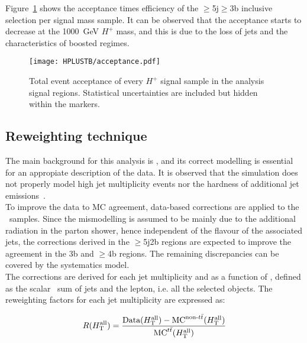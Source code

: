 Figure~\ref{Hplustb:acceptance} shows the acceptance times efficiency of the $\geq$5j$\geq$3b inclusive selection per signal mass sample. It can be observed that the acceptance starts to decrease at the 1000~GeV $H^+$ mass, and this is due to the loss of jets and the characteristics of boosted regimes.

\begin{figure}[htbp]
    \RawFloats
    \begin{center}
    \texttt{[image: HPLUSTB/acceptance.pdf]}
    \caption{
        Total event acceptance of every $H^+$ signal sample in the analysis signal regions. Statistical uncertainties are included but hidden within the markers.
    }
    \label{Hplustb:acceptance}
    \end{center}
\end{figure}

\clearpage
\subsection{Reweighting technique}
\label{Hplustb:secRW}
The main background for this analysis is \ttjets, and its correct modelling is essential for an appropiate description of the data. It is observed that the simulation does not properly model high jet multiplicity events nor the hardness of additional jet emissions~\cite{ATL-PHYS-PUB-2018-009,10.1007/JHEP01(2021)033}.\\

To improve the data to MC agreement, data-based corrections are applied to the \ttbar\ samples. Since the mismodelling is assumed to be mainly due to the additional radiation in the parton shower, hence independent of the flavour of the associated jets, the corrections derived in the $\geq$5j2b regions are expected to improve the agreement in the 3b and $\geq$4b regions. The remaining discrepancies can be covered by the systematics model.\\

The corrections are derived for each jet multiplicity and as a function of \HTall, defined as the scalar \pT\ sum of jets and the lepton, i.e. all the selected objects. The reweighting factors for each jet multiplicity are expressed as:

\begin{equation}
    \label{Hplustb:RWeq}
    R(H_{\text{T}}^{\text{all}})=\frac{ \text{Data}(H_{\text{T}}^{\text{all}}) - \text{MC}^{\text{non-\ensuremath{t\bar{t}}}}(H_{\text{T}}^{\text{all}}) }{\text{MC}^{\text{\ensuremath{t\bar{t}}}}(H_{\text{T}}^{\text{all}})}
\end{equation}

